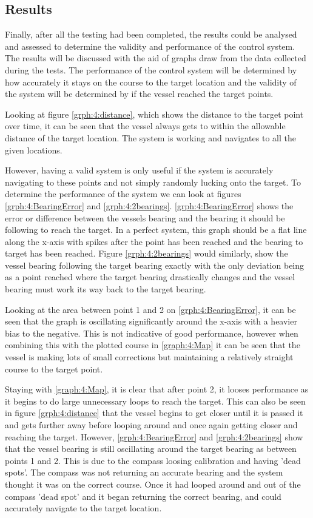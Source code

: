 \subsection{Results}
Finally, after all the testing had been completed, the results could be analysed and assessed to determine the validity and performance of the control system. The results will be discussed with the aid of graphs draw from the data collected during the tests. The performance of the control system will be determined by how accurately it stays on the course to the target location and the validity of the system will be determined by if the vessel reached the target points. \par
Looking at figure \ref{grph:4:distance}, which shows the distance to the target point over time, it can be seen that the vessel always gets to within the allowable distance of the target location. The system is working and navigates to all the given locations.\par
However, having a valid system is only useful if the system is accurately navigating to these points and not simply randomly lucking onto the target. To determine the performance of the system we can look at figures \ref{grph:4:BearingError} and \ref{grph:4:2bearings}. \ref{grph:4:BearingError} shows the error or difference between the vessels bearing and the bearing it should be following to reach the target. In a perfect system, this graph should be a flat line along the x-axis with spikes after the point has been reached and the bearing to target has been reached. Figure \ref{grph:4:2bearings} would similarly, show the vessel bearing following the target bearing exactly with the only deviation being as a point reached where the target bearing drastically changes and the vessel bearing must work its way back to the target bearing.\par 
Looking at the area between point 1 and 2 on \ref{grph:4:BearingError}, it can be seen that the graph is oscillating significantly around the x-axis with a heavier bias to the negative. This is not indicative of good performance, however when combining this with the plotted course in \ref{graph:4:Map} it can be seen that the vessel is making lots of small corrections but maintaining a relatively straight course to the target point.\par
Staying with \ref{graph:4:Map}, it is clear that after point 2, it looses performance as it begins to do large unnecessary loops to reach the target. This can also be seen in figure \ref{grph:4:distance} that the vessel begins to get closer until it is passed it and gets further away before looping around and once again getting closer and reaching the target. However, \ref{grph:4:BearingError} and \ref{grph:4:2bearings} show that the vessel bearing is still oscillating around the target bearing as between points 1 and 2. This is due to the compass loosing calibration and having 'dead spots'. The compass was not returning an accurate bearing and the system thought it was on the correct course. Once it had looped around and out of the compass 'dead spot' and it began returning the correct bearing, and could accurately navigate to the target location. 
